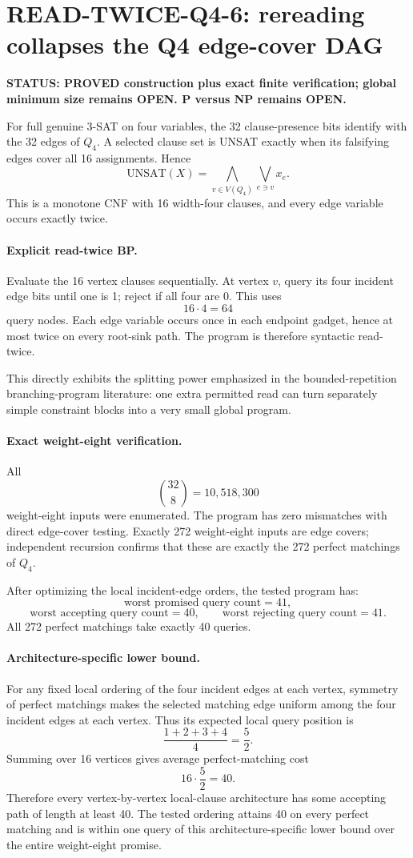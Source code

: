 \section*{READ-TWICE-Q4-6: rereading collapses the Q4 edge-cover DAG}

\textbf{STATUS: PROVED construction plus exact finite verification; global minimum size remains OPEN. P versus NP remains OPEN.}

For full genuine 3-SAT on four variables, the 32 clause-presence bits identify with the
32 edges of $Q_4$. A selected clause set is UNSAT exactly when its falsifying edges cover
all 16 assignments. Hence
\[
\mathrm{UNSAT}(X)
=
\bigwedge_{v\in V(Q_4)}
\bigvee_{e\ni v} x_e.
\]
This is a monotone CNF with 16 width-four clauses, and every edge variable occurs exactly
twice.

\paragraph{Explicit read-twice BP.}
Evaluate the 16 vertex clauses sequentially. At vertex $v$, query its four incident edge
bits until one is 1; reject if all four are 0. This uses
\[
16\cdot4=\boxed{64}
\]
query nodes. Each edge variable occurs once in each endpoint gadget, hence at most twice on
every root-sink path. The program is therefore syntactic read-twice.

This directly exhibits the splitting power emphasized in the bounded-repetition branching-program
literature: one extra permitted read can turn separately simple constraint blocks into a very
small global program.

\paragraph{Exact weight-eight verification.}
All
\[
\binom{32}{8}=10{,}518{,}300
\]
weight-eight inputs were enumerated. The program has zero mismatches with direct edge-cover
testing. Exactly 272 weight-eight inputs are edge covers; independent recursion confirms that
these are exactly the 272 perfect matchings of $Q_4$.

After optimizing the local incident-edge orders, the tested program has:
\[
\text{worst promised query count}=41,
\]
\[
\text{worst accepting query count}=40,
\qquad
\text{worst rejecting query count}=41.
\]
All 272 perfect matchings take exactly 40 queries.

\paragraph{Architecture-specific lower bound.}
For any fixed local ordering of the four incident edges at each vertex, symmetry of perfect
matchings makes the selected matching edge uniform among the four incident edges at each
vertex. Thus its expected local query position is
\[
\frac{1+2+3+4}{4}=\frac52.
\]
Summing over 16 vertices gives average perfect-matching cost
\[
16\cdot\frac52=40.
\]
Therefore every vertex-by-vertex local-clause architecture has some accepting path of length
at least 40. The tested ordering attains 40 on every perfect matching and is within one query
of this architecture-specific lower bound over the entire weight-eight promise.

